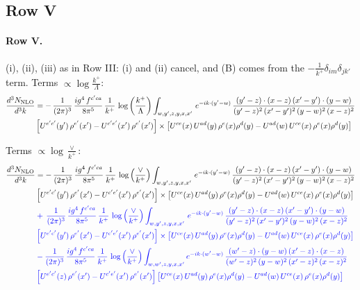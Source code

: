 \documentclass[10pt]{article}
\numberwithin{equation}{section}
\newcommand{\nc}{\color{blue}}
\begin{document}
\subsection{Row V}
\paragraph{Row V.}
(i), (ii), (iii) as in Row III: (i) and (ii) cancel, and (B) comes from the $-\frac{1}{k^+}\delta_{im}\delta_{jk'}$ term.
\noindent Terms $\propto\log\frac{k^+}{\Lambda}$:
\begin{align}
    \frac{d^{3}N_{\rm NLO}}{d^{3}k} & =   -\,\frac{1}{(2\pi)^{3}}\, \frac{ig^{4}\,f^{c'ca}}{8\pi^{5}}\, \frac{1}{k^{+}}\,\log{\left(\frac{k^{+}}{\Lambda}\right)} \int_{w,y',z,y,x,x'}\, e^{-ik\cdot (y'-w)}\,\frac{(y'-z)\cdot (x-z)\,(x'-y')\cdot (y-w)}{(y'-z)^{2}\,(x'-y')^{2}\,(y-w)^{2}\,(x-z)^{2}}\notag \\ & \left[U^{e'c'}(y')\,\rho^{e'}(x')-U^{c'e'}(x')\,\rho^{e'}(x')\right]\times  \left[U^{ce}(x)\,U^{ad}(y)\,\rho^{e}(x)\rho^{d}(y)-U^{ad}(w)\,U^{ce}(x)\,\rho^{e}(x)\rho^{d}(y)\right] \label{eq:J:G3V}
\end{align}

\noindent Terms $\propto\log\frac{\vee}{k^+}$:
\begin{align}
    \frac{d^{3}N_{\rm NLO}}{d^{3}k} & =   -\,\frac{1}{(2\pi)^{3}}\, \frac{ig^{4}\,f^{c'ca}}{8\pi^{5}}\, \frac{1}{k^{+}}\,\log{\left(\frac{\vee}{k^{+}}\right)} \int_{w,y',z,y,x,x'}\, e^{-ik\cdot (y'-w)}\,\frac{(y'-z)\cdot (x-z)\,(x'-y')\cdot (y-w)}{(y'-z)^{2}\,(x'-y')^{2}\,(y-w)^{2}\,(x-z)^{2}}\notag \\ & \left[U^{e'c'}(y')\,\rho^{e'}(x')-U^{c'e'}(x')\,\rho^{e'}(x')\right]\times  \left[U^{ce}(x)\,U^{ad}(y)\,\rho^{e}(x)\rho^{d}(y)-U^{ad}(w)\,U^{ce}(x)\,\rho^{e}(x)\rho^{d}(y)\right] \notag \\
& \nc  +\,\frac{1}{(2\pi)^{3}}\, \frac{ig^{4}\,f^{c'ca}}{8\pi^{5}}\, \frac{1}{k^{+}}\,\log{\left(\frac{\vee}{k^{+}}\right)} \int_{w,y',z,y,x,x'}\, e^{-ik\cdot (y'-w)}\,\frac{(y'-z)\cdot (x-z)\,(x'-y')\cdot (y-w)}{(y'-z)^{2}\,(x'-y')^{2}\,(y-w)^{2}\,(x-z)^{2}}\notag \\ & \nc  \left[U^{e'c'}(y')\,\rho^{e'}(x')-U^{c'e'}(x')\,\rho^{e'}(x')\right]\times  \left[U^{ce}(x)\,U^{ad}(y)\,\rho^{e}(x)\rho^{d}(y)-U^{ad}(w)\,U^{ce}(x)\,\rho^{e}(x)\rho^{d}(y)\right] \notag \\
& \nc  -\frac{1}{(2\pi)^{3}}\, \frac{ig^{4}\,f^{c'ca}}{8\pi^{5}}\, \frac{1}{k^{+}}\,\log{\left(\frac{\vee}{k^{+}}\right)}\int_{w,w',z,y,x,x'} e^{-ik\cdot (w'-w)}\,\frac{(w'-z)\cdot (y-w)\,(x'-z)\cdot (x-z)}{(w'-z)^{2}\,(y-w)^{2}\,(x'-z)^{2}\,(x-z)^{2}}\notag \\
& \nc  \left[U^{e'c'}(z)\,\rho^{e'}(x')-U^{c'e'}(x')\,\rho^{e'}(x')\right]\left[U^{ce}(x)\,U^{ad}(y)\,\rho^{e}(x)\rho^{d}(y)-U^{ad}(w)\,U^{ce}(x)\,\rho^{e}(x)\rho^{d}(y)\right] \label{eq:B:G3V}
\end{align}
\end{document}
